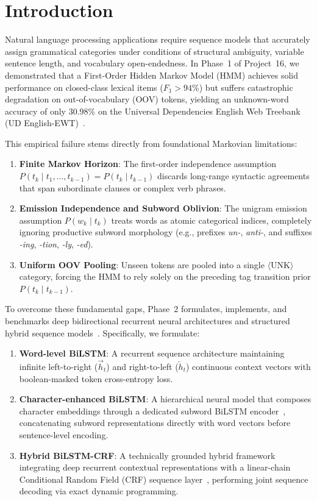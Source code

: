 \documentclass[conference]{IEEEtran}
\begin{document}
\section{Introduction}
Natural language processing applications require sequence models that accurately assign grammatical categories under conditions of structural ambiguity, variable sentence length, and vocabulary open-endedness. In Phase~1 of Project~16, we demonstrated that a First-Order Hidden Markov Model (HMM) achieves solid performance on closed-class lexical items ($F_1 > 94\%$) but suffers catastrophic degradation on out-of-vocabulary (OOV) tokens, yielding an unknown-word accuracy of only $30.98\%$ on the Universal Dependencies English Web Treebank (UD English-EWT)~\cite{silveira2014gold}.

This empirical failure stems directly from foundational Markovian limitations:
\begin{enumerate}
    \item \textbf{Finite Markov Horizon}: The first-order independence assumption $P(t_k \mid t_1, \dots, t_{k-1}) = P(t_k \mid t_{k-1})$ discards long-range syntactic agreements that span subordinate clauses or complex verb phrases.
    \item \textbf{Emission Independence and Subword Oblivion}: The unigram emission assumption $P(w_k \mid t_k)$ treats words as atomic categorical indices, completely ignoring productive subword morphology (e.g., prefixes \textit{un-}, \textit{anti-}, and suffixes \textit{-ing}, \textit{-tion}, \textit{-ly}, \textit{-ed}).
    \item \textbf{Uniform OOV Pooling}: Unseen tokens are pooled into a single $\langle\text{UNK}\rangle$ category, forcing the HMM to rely solely on the preceding tag transition prior $P(t_k \mid t_{k-1})$.
\end{enumerate}

To overcome these fundamental gaps, Phase~2 formulates, implements, and benchmarks deep bidirectional recurrent neural architectures and structured hybrid sequence models~\cite{hochreiter1997lstm, graves2005framewise, huang2015bidirectional, lample2016neural, ma2016end}. Specifically, we formulate:
\begin{enumerate}
    \item \textbf{Word-level BiLSTM}: A recurrent sequence architecture maintaining infinite left-to-right ($\overrightarrow{h}_t$) and right-to-left ($\overleftarrow{h}_t$) continuous context vectors with boolean-masked token cross-entropy loss.
    \item \textbf{Character-enhanced BiLSTM}: A hierarchical neural model that composes character embeddings through a dedicated subword BiLSTM encoder~\cite{lample2016neural}, concatenating subword representations directly with word vectors before sentence-level encoding.
    \item \textbf{Hybrid BiLSTM-CRF}: A technically grounded hybrid framework integrating deep recurrent contextual representations with a linear-chain Conditional Random Field (CRF) sequence layer~\cite{huang2015bidirectional, ma2016end}, performing joint sequence decoding via exact dynamic programming.
\end{enumerate}
\end{document}
